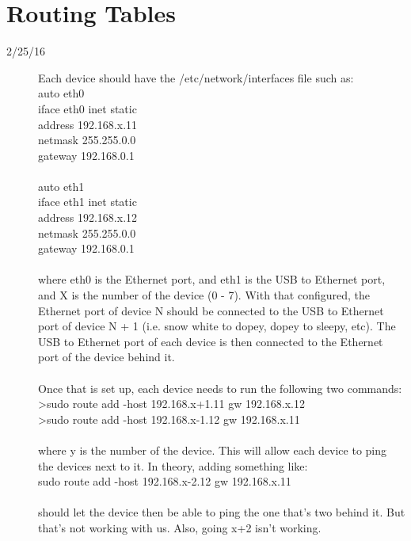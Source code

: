 \section{Routing Tables}
\begin{description}
\item [2/25/16] Each device should have the /etc/network/interfaces file such as: \\
auto eth0 \\
iface eth0 inet static \\
	address 192.168.x.11 \\
	netmask 255.255.0.0 \\
	gateway 192.168.0.1 \\ \\
auto eth1 \\
iface eth1 inet static \\
	address 192.168.x.12 \\
	netmask 255.255.0.0 \\
	gateway 192.168.0.1 \\ \\
where eth0 is the Ethernet port, and eth1 is the USB to Ethernet port, and X is the number of the device (0 - 7). With that configured, the Ethernet port of device N should be connected to the USB to Ethernet port of device N + 1 (i.e. snow white to dopey, dopey to sleepy, etc). The USB to Ethernet port of each device is then connected to the Ethernet port of the device behind it. \\ \\
Once that is set up, each device needs to run the following two commands: \\
>sudo route add -host 192.168.x+1.11 gw 192.168.x.12 \\
>sudo route add -host 192.168.x-1.12 gw 192.168.x.11 \\ \\
where y is the number of the device. This will allow each device to ping the devices next to it. In theory, adding something like: \\
sudo route add -host 192.168.x-2.12 gw 192.168.x.11 \\ \\
should let the device then be able to ping the one that's two behind it. But that's not working with us. Also, going x+2 isn't working.


\end{description}
